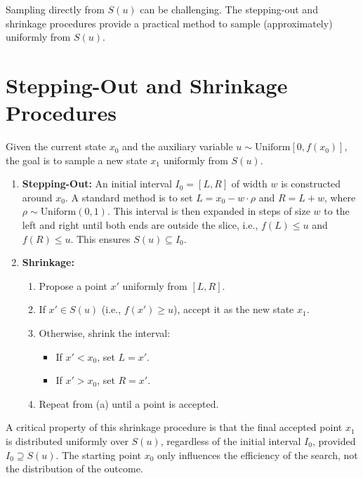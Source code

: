 \documentclass[12pt, oneside, paper=A4, DIV=15, BCOR=0mm, abstract=true, headings=small]{scrartcl}
\theoremstyle{customdef}
\begin{document}
Sampling directly from \( S(u) \) can be challenging. The stepping-out and shrinkage procedures provide a practical method to sample (approximately) uniformly from \( S(u) \).

\section{Stepping-Out and Shrinkage Procedures}
Given the current state \( x_0 \) and the auxiliary variable \( u \sim \text{Uniform}[0, f(x_0)] \), the goal is to sample a new state \( x_1 \) uniformly from \( S(u) \).

\begin{algorithm}
\begin{enumerate}[label=\textbf{Step \arabic*.}, leftmargin=0pt, itemindent=*, align=left]
    \item \textbf{Stepping-Out:} An initial interval \( I_0 = [L, R] \) of width \( w \) is constructed around \( x_0 \). A standard method is to set \( L = x_0 - w \cdot \rho \) and \( R = L + w \), where \( \rho \sim \text{Uniform}(0,1) \). This interval is then expanded in steps of size \( w \) to the left and right until both ends are outside the slice, i.e., \( f(L) \le u \) and \( f(R) \le u \). This ensures \( S(u) \subseteq I_0 \).
    \item \textbf{Shrinkage:}
    \begin{enumerate}
        \item Propose a point \( x' \) uniformly from \( [L, R] \).
        \item If \( x' \in S(u) \) (i.e., \( f(x') \ge u \)), accept it as the new state \( x_1 \).
        \item Otherwise, shrink the interval:
        \begin{itemize}
            \item If \( x' < x_0 \), set \( L = x' \).
            \item If \( x' > x_0 \), set \( R = x' \).
        \end{itemize}
        \item Repeat from (a) until a point is accepted.
    \end{enumerate}
\end{enumerate}
A critical property of this shrinkage procedure is that the final accepted point \( x_1 \) is distributed uniformly over \( S(u) \), regardless of the initial interval \( I_0 \), provided \( I_0 \supseteq S(u) \). The starting point \( x_0 \) only influences the efficiency of the search, not the distribution of the outcome.
\end{algorithm}
\end{document}
